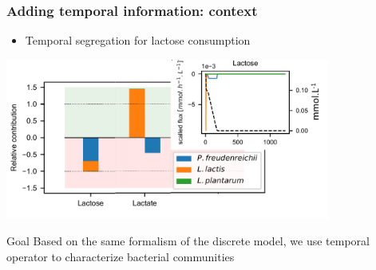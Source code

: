 \documentclass[8pt,usenames,dvipsnames]{beamer}
\begin{document}
\begin{frame}
\frametitle{Adding temporal information: context}
\begin{itemize}
\item Temporal segregation for lactose consumption
\end{itemize}

\centering
\includegraphics[width=0.8\textwidth]{figures/relative-contribution.pdf}

\begin{block}{Goal}
Based on the same formalism of the discrete model, we use temporal operator to characterize bacterial communities
\end{block}

\end{frame}
\end{document}

